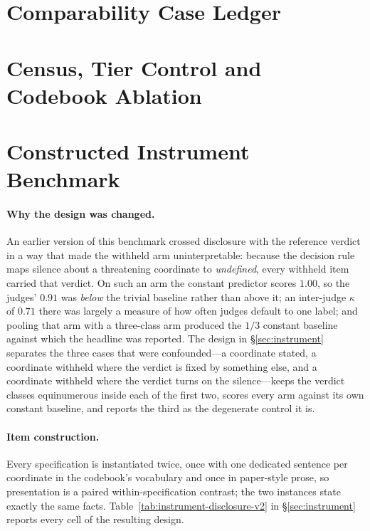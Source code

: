 \documentclass[11pt]{article}
\begin{document}
\FloatBarrier
\section{Comparability Case Ledger}
\label{sec:appendix-cases}





\FloatBarrier
\section{Census, Tier Control and Codebook Ablation}
\label{sec:appendix-census}






\FloatBarrier
\section{Constructed Instrument Benchmark}
\label{sec:appendix-instrument}

\paragraph{Why the design was changed.}
An earlier version of this benchmark crossed disclosure with the reference
verdict in a way that made the withheld arm uninterpretable: because the
decision rule maps silence about a threatening coordinate to \emph{undefined},
every withheld item carried that verdict. On such an arm the constant predictor
scores $1.00$, so the judges' $0.91$ was \emph{below} the trivial baseline
rather than above it; an inter-judge $\kappa$ of $0.71$ there was largely a
measure of how often judges default to one label; and pooling that arm with a
three-class arm produced the $1/3$ constant baseline against which the headline
was reported. The design in \S\ref{sec:instrument} separates the three cases
that were confounded---a coordinate stated, a coordinate withheld where the
verdict is fixed by something else, and a coordinate withheld where the verdict
turns on the silence---keeps the verdict classes equinumerous inside each of the
first two, scores every arm against its own constant baseline, and reports the
third as the degenerate control it is.



\paragraph{Item construction.}
Every specification is instantiated twice, once with one dedicated sentence per
coordinate in the codebook's vocabulary and once in paper-style prose, so
presentation is a paired within-specification contrast; the two instances state
exactly the same facts. Table~\ref{tab:instrument-disclosure-v2} in
\S\ref{sec:instrument} reports every cell of the resulting design.
\end{document}
